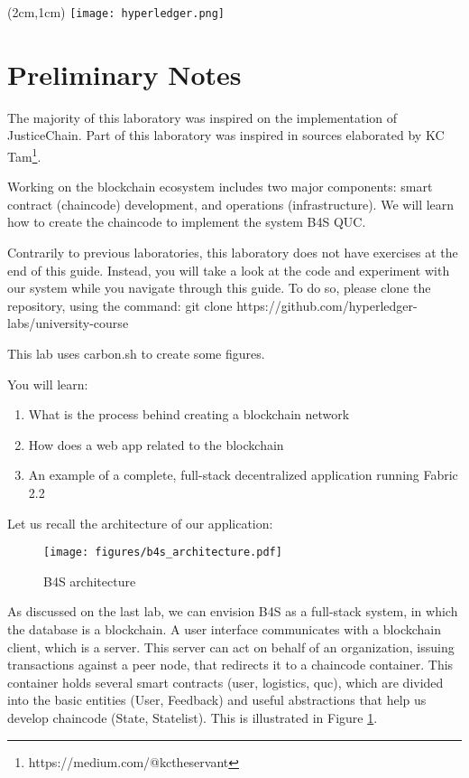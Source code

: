\documentclass[12pt,a4paper]{article}
\theoremstyle{definition}
\begin{document}
\textblockorigin{-34pt}{-12pt}
\begin{textblock*}{10cm}(2cm,1cm)
\texttt{[image: hyperledger.png]}
\end{textblock*}
\newtheorem{mydef}{Definition}

\section*{Preliminary Notes}
The majority of this laboratory was inspired on the implementation of JusticeChain\cite{belchior2019_audits}. Part of this laboratory was inspired in sources elaborated by KC Tam\footnote{https://medium.com/@kctheservant}.

Working on the blockchain ecosystem includes two major  components: smart contract (chaincode) development, and operations (infrastructure). We will learn how to create the chaincode to implement the system B4S QUC.  

Contrarily to previous laboratories, this laboratory does not have exercises at the end of this guide. Instead, you will take a look at the code and experiment with our system while you navigate through this guide.
To do so, please clone the repository, using the command:
{git clone https://github.com/hyperledger-labs/university-course}

This lab uses carbon.sh to create some figures.

You will learn:
\begin{enumerate}
    \item What is the process behind creating a blockchain network
    \item How does a web app related to the blockchain
    \item An example of a complete, full-stack decentralized application running Fabric 2.2
\end{enumerate}

Let us recall the architecture of our application:


\begin{figure}[h]
    \centering
    \texttt{[image: figures/b4s\_architecture.pdf]}
    \caption{B4S architecture}
    \label{fig:b4s}
\end{figure}

As discussed on the last lab, we can envision B4S as a full-stack system, in which the database is a blockchain. A user interface communicates with a blockchain client, which is a server. This server can act on behalf of an organization, issuing transactions against a peer node, that redirects it to a chaincode container. This container holds several smart contracts (user, logistics, quc), which are divided into the basic entities (User, Feedback) and useful abstractions that help us develop chaincode (State, Statelist). This is illustrated in Figure \ref{fig:b4s}.
\end{document}

